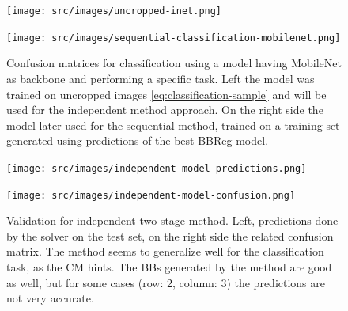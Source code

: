 \begin{figure}
    \centering
    \begin{multicols}{2}
        \begin{minipage}{.45\textwidth}
         \texttt{[image: src/images/uncropped-inet.png]}
        \end{minipage}
        \columnbreak
        \begin{minipage}{.45\textwidth}
           \texttt{[image: src/images/sequential-classification-mobilenet.png]}
        \end{minipage}
    \end{multicols}
    \caption{Confusion matrices for classification using a model having MobileNet as backbone and performing a specific task. Left the model was trained on uncropped images \eqref{eq:classification-sample} and will be used for the independent method approach. On the right side the model later used for the sequential method, trained on a training set generated using predictions of the best BBReg model.}
    \label{fig:extra-classification-mobilenet}
\end{figure}
\begin{figure}
    \centering
    \begin{multicols}{2}
        \begin{minipage}{.45\textwidth}
            \texttt{[image: src/images/independent-model-predictions.png]}
        \end{minipage}
        \columnbreak
        \begin{minipage}{.45\textwidth}
            \vspace{20pt}
            \texttt{[image: src/images/independent-model-confusion.png]}
        \end{minipage}
    \end{multicols}
    \caption{Validation for independent two-stage-method. Left, predictions done by the solver on the test set, on the right side the related confusion matrix. The method seems to generalize well for the classification task, as the CM hints. The BBs generated by the method are good as well, but for some cases (row: 2, column: 3) the predictions are not very accurate.}
    \label{fig:independent-results}
\end{figure}
